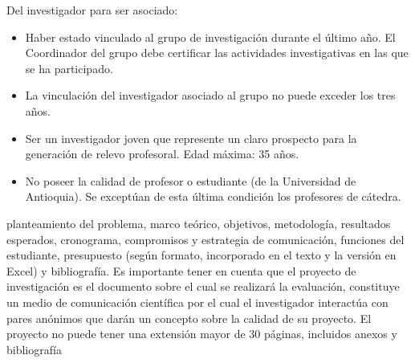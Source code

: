 \documentclass[11pt]{article}
\begin{document}
\begin{instrucciones}
  Del investigador para ser asociado:
  \begin{itemize}
  \item  Haber estado vinculado al grupo de investigación durante el último año. El Coordinador del grupo debe certificar las actividades investigativas en las que se ha participado.

  \item La vinculación del investigador asociado al grupo no puede exceder los tres años.

  \item Ser un investigador joven que represente un claro prospecto para la generación de relevo profesoral. Edad máxima: 35 años.

  \item No poseer la calidad de profesor o estudiante (de la Universidad de Antioquia). Se exceptúan de esta última condición los profesores de cátedra.
  \end{itemize}
\end{instrucciones}



\begin{instrucciones}
planteamiento del problema, marco teórico, objetivos, 
metodología, resultados esperados, cronograma, compromisos y estrategia de comunicación, funciones del 
estudiante, presupuesto (según formato, incorporado en el texto y la versión en Excel) y  bibliografía.  Es 
importante tener en cuenta que el proyecto de investigación es el documento sobre el cual se realizará la 
evaluación, constituye un medio de comunicación científica por el cual el investigador interactúa con pares 
anónimos que darán un concepto sobre la calidad de su proyecto. El proyecto no puede tener una 
extensión mayor de  30 páginas, incluidos anexos y bibliografía
\end{instrucciones}



%


\vspace{-0.5cm}

\vspace{-0.3cm}
\begin{soloproyecto}
  
\end{soloproyecto}
\vspace{-0.3cm}

\vspace{-0.3cm}

\vspace{-0.3cm}

\vspace{-0.3cm}

\vspace{-0.3cm}

\vspace{-0.3cm}


%
\end{document}
